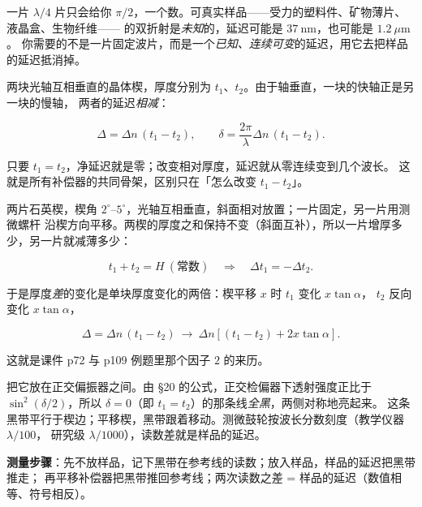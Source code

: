 \documentclass[11pt]{ctexart}
\let\subhdrtheme\subhdr
\renewcommand{\subhdr}[1]{\needspace{3\baselineskip}\subhdrtheme{#1}}
\let\hdrorig\hdr
\renewcommand{\hdr}[2]{\needspace{8\baselineskip}\hdrorig{#1}{#2}}
\begin{document}


一片 $\lambda/4$ 片只会给你 $\pi/2$，一个数。可真实样品——受力的塑料件、矿物薄片、液晶盒、生物纤维——
的双折射是\emph{未知}的，延迟可能是 $37\ \mathrm{nm}$，也可能是 $1.2\ \mu\mathrm{m}$。
你需要的不是一片固定波片，而是一个\emph{已知、连续可变}的延迟，用它去把样品的延迟抵消掉。


两块光轴互相垂直的晶体楔，厚度分别为 $t_1$、$t_2$。由于轴垂直，一块的快轴正是另一块的慢轴，
两者的延迟\emph{相减}：

\[
\Delta=\Delta n\,(t_1-t_2),\qquad
\delta=\frac{2\pi}{\lambda}\Delta n\,(t_1-t_2).
\]

只要 $t_1=t_2$，净延迟就是零；改变相对厚度，延迟就从零连续变到几个波长。
这就是所有补偿器的共同骨架，区别只在「怎么改变 $t_1-t_2$」。



两片石英楔，楔角 $2^\circ$--$5^\circ$，光轴互相垂直，斜面相对放置；一片固定，另一片用测微螺杆
沿楔方向平移。两楔的厚度之和保持不变（斜面互补），所以一片增厚多少，另一片就减薄多少：

\[
t_1+t_2=H\ (\text{常数})\quad\Longrightarrow\quad \Delta t_1=-\Delta t_2 .
\]

于是厚度\emph{差}的变化是单块厚度变化的两倍：楔平移 $x$ 时 $t_1$ 变化 $x\tan\alpha$，
$t_2$ 反向变化 $x\tan\alpha$，

\[
\Delta=\Delta n\,(t_1-t_2)\ \longrightarrow\
\Delta n\left[(t_1-t_2)+2x\tan\alpha\right].
\]

这就是课件 p72 与 p109 例题里那个因子 $2$ 的来历。


把它放在正交偏振器之间。由 §20 的公式，正交检偏器下透射强度正比于
$\sin^2(\delta/2)$，所以 $\delta=0$（即 $t_1=t_2$）的那条线\emph{全黑}，两侧对称地亮起来。
这条黑带平行于楔边；平移楔，黑带跟着移动。测微鼓轮按波长分数刻度（教学仪器 $\lambda/100$，
研究级 $\lambda/1000$），读数差就是样品的延迟。

\textbf{测量步骤}：先不放样品，记下黑带在参考线的读数；放入样品，样品的延迟把黑带推走；
再平移补偿器把黑带推回参考线；两次读数之差 = 样品的延迟（数值相等、符号相反）。
\end{document}
